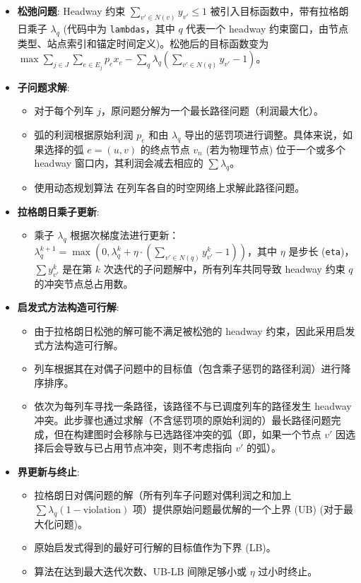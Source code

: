 \documentclass{article}
\begin{document}
    \begin{itemize}
        \item \textbf{松弛问题}: Headway 约束 $\sum_{v' \in N(v)} y_{v'} \le 1$
        被引入目标函数中，带有拉格朗日乘子 $\lambda_q$
        (代码中为 \texttt{lambdas}，其中 $q$ 代表一个 headway
        约束窗口，由节点类型、站点索引和锚定时间定义)。松弛后的目标函数变为 $\max
        \sum_{j \in J} \sum_{e \in E_j} p_e x_e - \sum_q \lambda_q
        (\sum_{v' \in N(q)} y_{v'} - 1)$。
        \item \textbf{子问题求解}:
        \begin{itemize}
            \item 对于每个列车 $j$，原问题分解为一个最长路径问题（利润最大化）。
            \item 弧的利润根据原始利润 $p_e$ 和由 $\lambda_q$
            导出的惩罚项进行调整。具体来说，如果选择的弧 $e=(u,v)$ 的终点节点 $v_n$ (若为物理节点)
            位于一个或多个 headway 窗口内，其利润会减去相应的 $\sum \lambda_q$。
            \item 使用动态规划算法 在列车各自的时空网络上求解此路径问题。
        \end{itemize}
        \item \textbf{拉格朗日乘子更新}:
        \begin{itemize}
            \item 乘子 $\lambda_q$ 根据次梯度法进行更新： $\lambda_q^{k+1} =
            \max(0, \lambda_q^k + \eta \cdot (\sum_{v' \in N(q)}
            y_{v'}^{k} - 1))$，其中 $\eta$ 是步长 (\texttt{eta})，$\sum
            y_{v'}^{k}$ 是在第 $k$ 次迭代的子问题解中，所有列车共同导致 headway 约束 $q$
            的冲突节点总占用数。
        \end{itemize}
        \item \textbf{启发式方法构造可行解}:
        \begin{itemize}
            \item 由于拉格朗日松弛的解可能不满足被松弛的 headway 约束，因此采用启发式方法构造可行解。
            \item 列车根据其在对偶子问题中的目标值（包含乘子惩罚的路径利润）进行降序排序。
            \item 依次为每列车寻找一条路径，该路径不与已调度列车的路径发生 headway
            冲突。此步骤也通过求解（不含惩罚项的原始利润的）最长路径问题完成，但在构建图时会移除与已选路径冲突的弧（即，如果一个节点
            $v'$ 因选择后会导致与已占用节点冲突，则不考虑指向 $v'$ 的弧）。
        \end{itemize}
        \item \textbf{界更新与终止}:
        \begin{itemize}
            \item 拉格朗日对偶问题的解（所有列车子问题对偶利润之和加上 $\sum \lambda_q (1 -
            \text{violation})$ 项）提供原始问题最优解的一个上界 (UB) (对于最大化问题)。
            \item 原始启发式得到的最好可行解的目标值作为下界 (LB)。
            \item 算法在达到最大迭代次数、UB-LB 间隙足够小或 $\eta$ 过小时终止。
        \end{itemize}
    \end{itemize}
\end{document}
